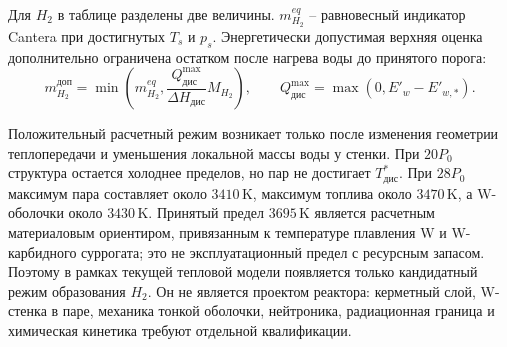 Для \(H_2\) в таблице разделены две величины. \(m_{H_2}^{eq}\) -- равновесный индикатор Cantera при достигнутых \(T_s\) и \(p_s\). Энергетически допустимая верхняя оценка дополнительно ограничена остатком после нагрева воды до принятого порога:
\[
m_{H_2}^{\mathrm{доп}}=
\min\left(
m_{H_2}^{eq},
\frac{Q_{\mathrm{дис}}^{\max}}{\Delta H_{\mathrm{дис}}}M_{H_2}
\right),
\qquad
Q_{\mathrm{дис}}^{\max}=\max\left(0,E'_w-E'_{w,*}\right).
\]

Положительный расчетный режим возникает только после изменения геометрии теплопередачи и уменьшения локальной массы воды у стенки. При \(20P_0\) структура остается холоднее пределов, но пар не достигает \(T^*_{\mathrm{дис}}\). При \(28P_0\) максимум пара составляет около \(3410\,\mathrm{K}\), максимум топлива около \(3470\,\mathrm{K}\), а W-оболочки около \(3430\,\mathrm{K}\). Принятый предел \(3695\,\mathrm{K}\) является расчетным материаловым ориентиром, привязанным к температуре плавления W и W-карбидного суррогата; это не эксплуатационный предел с ресурсным запасом. Поэтому в рамках текущей тепловой модели появляется только кандидатный режим образования \(H_2\). Он не является проектом реактора: керметный слой, W-стенка в паре, механика тонкой оболочки, нейтроника, радиационная граница и химическая кинетика требуют отдельной квалификации.
